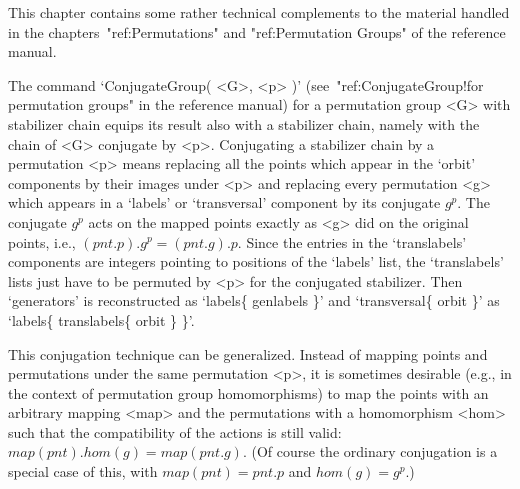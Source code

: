 
This  chapter contains some rather  technical complements to the material
handled in the chapters~"ref:Permutations" and "ref:Permutation Groups"  of
the reference manual.


The  command  `ConjugateGroup( <G>,  <p>  )' (see~"ref:ConjugateGroup!for
permutation groups" in the reference  manual) for a permutation group <G>
with  stabilizer chain equips its  result  also with  a stabilizer chain,
namely with the  chain of <G>  conjugate by <p>. Conjugating a stabilizer
chain by a permutation <p> means replacing all the points which appear in
the `orbit' components  by their  images  under <p>  and replacing  every
permutation <g> which appears in a `labels' or `transversal' component by
its  conjugate $g^p$. The conjugate   $g^p$  acts  on the mapped   points
exactly  as  <g>  did  on  the original points,    i.e.,  $(pnt.p). g^p =
(pnt.g).p$.  Since  the  entries   in  the  `translabels' components  are
integers pointing to  positions  of the `labels' list,  the `translabels'
lists just have to be permuted by <p> for the conjugated stabilizer. Then
`generators' is  reconstructed     as   `labels\{ genlabels   \}'     and
`transversal\{ orbit \}' as `labels\{ translabels\{ orbit \} \}'.

This    conjugation technique    can be    generalized.  Instead of mapping  points and permutations under
the same permutation <p>, it is sometimes desirable (e.g., in the context
of permutation  group homomorphisms) to  map the points with an arbitrary
mapping <map>  and the permutations with  a homomorphism <hom>  such that
the  compatibility  of the actions is  still   valid: $map(pnt). hom(g) =
map(pnt.g)$. (Of course   the ordinary conjugation is  a  special case of
this, with $map(pnt) = pnt.p$ and $hom(g) = g^p$.)

